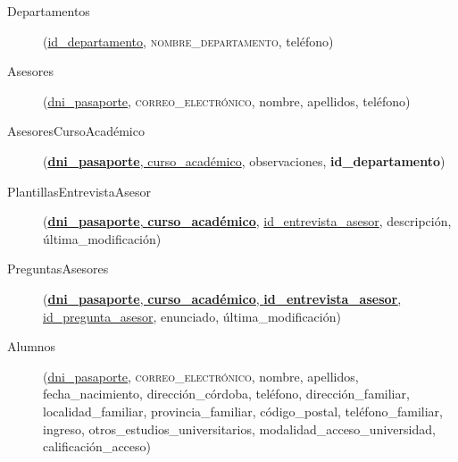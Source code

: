   \begin{description}
    \item[Departamentos] \begin{flushleft}(\underline{id\_departamento},
    \textsc{nombre\_departamento}, teléfono)\end{flushleft}
  \end{description}

  \begin{description}
    \item[Asesores] \begin{flushleft}(\underline{dni\_pasaporte},
    \textsc{correo\_electrónico}, nombre, apellidos, teléfono)\end{flushleft}
  \end{description}

  \begin{description}
    \item[AsesoresCursoAcadémico] \begin{flushleft}(\underline{\textbf{dni\_pasaporte},
    curso\_académico}, observaciones, \textbf{id\_departamento})\end{flushleft}
  \end{description}

  \begin{description}
    \item[PlantillasEntrevistaAsesor] \begin{flushleft}(\underline{\textbf{dni\_pasaporte},
    \textbf{curso\_académico},} \underline{id\_entrevista\_asesor}, descripción,
    última\_modificación)\end{flushleft}
  \end{description}

  \begin{description}
    \item[PreguntasAsesores] \begin{flushleft}(\underline{\textbf{dni\_pasaporte},
    \textbf{curso\_académico}, \textbf{id\_entrevista\_asesor},}
    \underline{id\_pregunta\_asesor}, enunciado, última\_modificación)\end{flushleft}
  \end{description}

  \begin{description}
    \item[Alumnos] \begin{flushleft}(\underline{dni\_pasaporte},
    \textsc{correo\_electrónico}, nombre, apellidos, fecha\_nacimiento,
    dirección\_córdoba, teléfono, dirección\_familiar, localidad\_familiar,
    provincia\_familiar, código\_postal, teléfono\_familiar, ingreso,
    otros\_estudios\_universitarios, modalidad\_acceso\_universidad,
    calificación\_acceso)\end{flushleft}
  \end{description}

